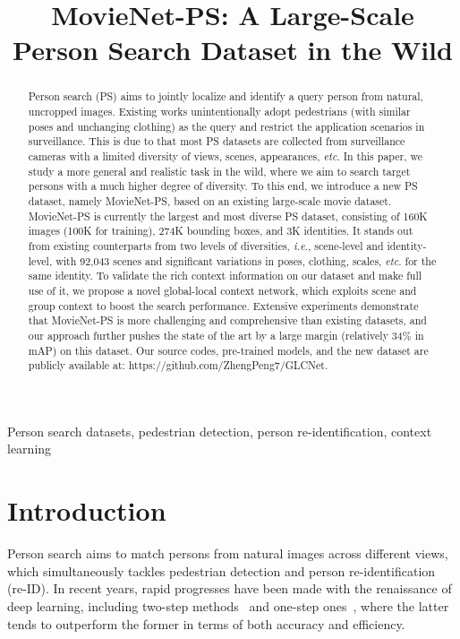 \documentclass{article}
\title{MovieNet-PS: A Large-Scale Person Search Dataset in the Wild}
\def\ie{\emph{i.e}.} \def\Ie{\emph{I.e}.}
\def\etc{\emph{etc}.} \def\vs{\emph{vs}.}
\begin{document}
\maketitle
\begin{abstract}
Person search (PS) aims to jointly localize and identify a query person from natural, uncropped images. Existing works unintentionally adopt pedestrians (with similar poses and unchanging clothing) as the query and restrict the application scenarios in surveillance. This is due to that most PS datasets are collected from surveillance cameras with a limited diversity of views, scenes, appearances, \etc{} In this paper, we study a more general and realistic task in the wild, where we aim to search target persons with a much higher degree of diversity. To this end, we introduce a new PS dataset, namely MovieNet-PS, based on an existing large-scale movie dataset. MovieNet-PS is currently the largest and most diverse PS dataset, consisting of 160K images (100K for training), 274K bounding boxes, and 3K identities. It stands out from existing counterparts from two levels of diversities, \ie, scene-level and identity-level, with 92,043 scenes and significant variations in poses, clothing, scales, \etc{} for the same identity. To validate the rich context information on our dataset and make full use of it, we propose a novel global-local context network, which exploits scene and group context to boost the search performance. Extensive experiments demonstrate that MovieNet-PS is more challenging and comprehensive than existing datasets, and our approach further pushes the state of the art by a large margin (relatively 34\% in mAP) on this dataset. Our source codes, pre-trained models, and the new dataset are publicly available at: https://github.com/ZhengPeng7/GLCNet.
\end{abstract}
\begin{keywords}
Person search datasets, pedestrian detection, person re-identification, context learning
\end{keywords}


\section{Introduction}
\label{sec:intro}
Person search aims to match persons from natural images across different views, which simultaneously tackles pedestrian detection and person re-identification (re-ID).
In recent years, rapid progresses have been made with the renaissance of deep learning, including two-step methods~\cite{TCTS,two_stage_method1,two_stage_method2,two_stage_method3} and one-step ones~\cite{OIM,Chen2018ContextRF,Yan2021AnchorFreePS}, where the latter tends to outperform the former in terms of both accuracy and efficiency.
\end{document}

